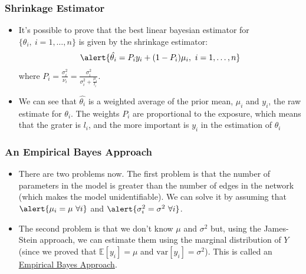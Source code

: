 \documentclass[c,10pt,pdftex]{beamer}
\begin{document}
\begin{frame}
\frametitle{Shrinkage Estimator}
\vspace{-0.75cm}
\begin{itemize}
	\setlength\itemsep{1em}
	\item It's possible to prove that the best linear bayesian estimator for $\lbrace \theta_{i}, \ i = 1, \dots, n \rbrace$ is given by the \alert{shrinkage estimator}:
	\[
	\alert{\hat{\theta_i} = P_iy_i + (1 - P_i)\mu_i, \ i = 1, \dots, n}
	\]
	where $P_i = \frac{\sigma^2_i}{\nu_i} = \frac{\sigma^2_i}{\sigma^2_i + \frac{\mu_i}{l_i}}$. 
	
	\item We can see that $\hat{\theta_i}$ is a weighted average of the prior mean, $\mu_i$ and $y_i$, the raw estimate for $\theta_{i}$. The weights $P_i$ are proportional to the exposure, which means that the grater is $l_i$, and the more important is $y_i$ in the estimation of $\theta_i$ 
\end{itemize}
\end{frame}

\begin{frame}
\frametitle{An Empirical Bayes Approach}
\vspace{-0.75cm}
\begin{itemize}
	\setlength\itemsep{1em}
	\item There are two problems now. The first problem is that the number of parameters in the model is greater than the number of edges in the network (which makes the model unidentifiable). We can solve it by assuming that $\alert{\mu_i = \mu \ \forall i}$ and $\alert{\sigma^2_i = \sigma^2 \ \forall i}$. 
	
	\item The second problem is that we don't know $\mu$ and $\sigma^2$ but, using the James-Stein approach, we can estimate them using the marginal distribution of $Y$ (since we proved that $\mathbb{E}[y_i] = \mu$ and $\text{var}[y_i] = \sigma^2$). This is called an \href{https://www.facebook.com/BayesianStatisticsBrokeMyPockets/photos/a.168432696942117/288206678298051/?type=3\&theater}{Empirical Bayes Approach}. 
\end{itemize}
\end{frame}
\end{document}
